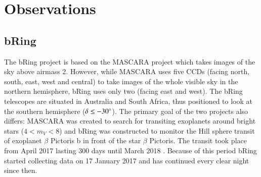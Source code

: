 \documentclass{aa}
\begin{document}



%

%
%
%
%
%
%

\section{Observations}\label{sec:obs}

\subsection{bRing}

The bRing project is based on the MASCARA project \citep{mascara} which takes images of the sky above airmass 2.
%
However, while MASCARA uses five CCDs (facing north, south, east, west and central) to take images of the whole visible sky in the northern hemisphere, bRing uses only two (facing east and west).
%
The bRing telescopes are situated in Australia and South Africa, thus positioned to look at the southern hemisphere ($\delta \leq -30 ^\circ $).
%
The primary goal of the two projects also differs: MASCARA was created to search for transiting exoplanets around bright stars ($4 < m_V < 8$) and bRing was constructed to monitor the Hill sphere transit of exoplanet $\beta$ Pictoris b in front of the star $\beta$ Pictoris.
%
The transit took place from April 2017 lasting 300 days until March 2018 \citep{Wang_2016}.
%
Because of this period bRing started collecting data on 17 January 2017 \citep{bring} and has continued every clear night since then.
\end{document}
